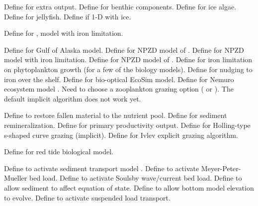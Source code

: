 \begin{klist}
\begin{klist}
\begin{klist}
       Define for extra output.
       Define for benthic components.
       Define for ice algae.
       Define for jellyfish.
       Define if 1-D with ice.
    \end{klist}
     Define for \citet{Xiu_2014},
  \citet{Xiu_2012} model with iron limitation.
    \begin{klist}
    \end{klist}
     Define for
    \citet{Hinckley_2009} Gulf of Alaska model.
     Define for NPZD model of \citet{Franks_86}.
     Define for NPZD model with iron limitation.
     Define for NPZD model of \citet{Powell_2006}.
     Define for iron limitation on phytoplankton
    growth (for a few of the biology models).
     Define for nudging to iron over the shelf.
     Define for bio-optical EcoSim model.
     Define for Nemuro ecosystem model \citep{Kishi_2007}.
    Need to choose a zooplankton grazing option ( or
    ). The default implicit  algorithm
    does not work yet. 
    \begin{klist}
        Define to restore fallen material to the
       nutrient pool.
        Define for sediment remineralization.
        Define for primary productivity output.
        Define for Holling-type s-shaped curve
       grazing (implicit).
        Define for Ivlev explicit grazing
       algorithm.
    \end{klist}
     Define for red tide biological model.
  \end{klist}
   \mbox{}
  \begin{klist}
     Define to activate sediment transport model
    \citep{Warner_2008}.
     Define to activate Meyer-Peter-Mueller bed load.
     Define to activate Soulsby wave/current
    bed load.
     Define to allow sediment to affect equation of
    state.
     Define to allow bottom model elevation to evolve.
     Define to activate suspended load transport.

\end{klist}
\end{klist}
